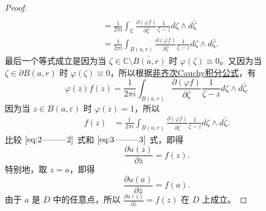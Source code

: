 \documentclass[../../main.tex]{subfiles}
\begin{document}
\begin{proof}
\begin{align}
\nonumber 
\\
&=\frac{1}{2\pi \mathrm{i}}\int_{\mathbb{C}}{\frac{\partial (\varphi f)}{\partial \bar{\zeta}}\frac{1}{\zeta -z}d\zeta}\land d\bar{\zeta}
\nonumber 
\\
&=\frac{1}{2\pi \mathrm{i}}\int_{B(a,r)}{\frac{\partial (\varphi f)}{\partial \bar{\zeta}}\frac{1}{\zeta -z}d\zeta}\land d\bar{\zeta}.\label{eq:2---------2}
\end{align}
最后一个等式成立是因为当 \( \zeta \in \mathbb{C} \setminus \overline{B(a,r)} \) 时 \( \varphi(\zeta) \equiv 0 \)。又因为当 \( \zeta \in \partial B(a,r) \) 时 \( \varphi(\zeta) \equiv 0 \)，所以根据\hyperref[theorem:非齐次Cauchy积分公式(Pompeiu公式)]{非齐次Cauchy积分公式}，有
\[
\varphi(z)f(z) = \frac{1}{2\pi i} \int_{B(a,r)} \frac{\partial(\varphi f)}{\partial \bar{\zeta}} \frac{1}{\zeta - z} d\zeta \wedge d\bar{\zeta}.
\]
因为当 \( z \in B(a,\varepsilon) \) 时 \( \varphi(z) = 1 \)，所以
\begin{align}
f(z) &= \frac{1}{2\pi i} \int_{B(a,r)} \frac{\partial(\varphi f)}{\partial \bar{\zeta}} \frac{1}{\zeta - z} d\zeta \wedge d\bar{\zeta}. \label{eq:3---------3}
\end{align}
比较 \(\eqref{eq:2---------2}\) 式和 \(\eqref{eq:3---------3}\) 式，即得
\[
\frac{\partial u(z)}{\partial \bar{z}} = f(z).
\]
特别地，取 \( z = a \)，即得
\[
\frac{\partial u(a)}{\partial \bar{z}} = f(a).
\]
由于 \( a \) 是 \( D \) 中的任意点，所以 \( \frac{\partial u(z)}{\partial \bar{z}} = f(z) \) 在 \( D \) 上成立。

\end{proof}
\end{document}
